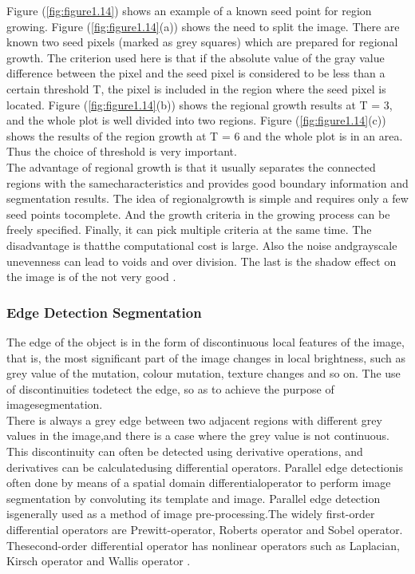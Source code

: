 \begin{enumerate}[label=(\alph*)]
                Figure (\ref{fig:figure1.14}) shows an example of a known seed point for region growing.
                Figure (\ref{fig:figure1.14}(a)) shows the need to split the image. There are known two seed pixels
                (marked as grey squares) which are prepared for regional growth. The criterion used here is
                that if the absolute value of the gray value difference between the pixel and the seed pixel
                is considered to be less than a certain threshold T, the pixel is included in the region where
                the seed pixel is located. Figure (\ref{fig:figure1.14}(b)) shows the regional growth results at T = 3,
                and the whole plot is well divided into two regions. Figure (\ref{fig:figure1.14}(c)) shows the results of
                the region growth at T = 6 and the whole plot is in an area. Thus the choice of threshold is very important.\\
                The advantage of regional growth is that it usually separates the connected regions with the
                samecharacteristics and provides good boundary information and segmentation results. The idea of regionalgrowth
                is simple and requires only a few seed points tocomplete. And the growth criteria in the growing process
                can be freely specified. Finally, it can pick multiple criteria at the same time. The disadvantage is thatthe
                computational cost is large. Also the noise andgrayscale unevenness can lead to voids and over division.
                The last is the shadow effect on the image is of the not very good \cite{1.18}.
        \end{enumerate}

\subsubsection{Edge Detection Segmentation}
The edge of the object is in the form of discontinuous local features of the image, that is,
the most significant part of the image changes in local brightness, such as grey value of the mutation,
colour mutation, texture changes and so on. The use of discontinuities todetect the edge, so as to achieve the purpose of imagesegmentation.\\
There is always a grey edge between two adjacent regions with different grey values in the image,and there is a
case where the grey value is not continuous. This discontinuity can often be detected using derivative operations,
and derivatives can be calculatedusing differential operators. Parallel edge detectionis often done by means of a spatial
domain differentialoperator to perform image segmentation by convoluting its template and image. Parallel edge detection
isgenerally used as a method of image pre-processing.The widely first-order differential operators are Prewitt-operator,
Roberts operator and Sobel operator. Thesecond-order differential operator has nonlinear operators such as Laplacian,
Kirsch operator and Wallis operator \cite{1.18}.\\

